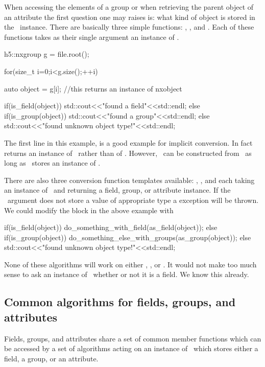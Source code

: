 
When accessing the elements of a group or when retrieving the parent object of
an attribute the first question one may raises is: what kind of object is stored
in the \nxobject\ instance. 
There are basically three simple functions: ,
, and . Each of these functions takes as their
single argument an instance of \nxobject. 
\begin{cppcode}
h5::nxgroup g = file.root();

for(size_t i=0;i<g.size();++i)
{
    auto object = g[i]; //this returns an instance of nxobject 

    if(is_field(object))
        std::cout<<"found a field"<<std::endl;
    else if(is_group(object))
        std::cout<<"found a group"<<std::endl;
    else
        std::cout<<"found unknown object type!"<<std::endl;
}
\end{cppcode}
The first line in this example,  is a 
good example for implicit conversion. In fact  returns an instance
of \nxobject\ rather than of \nxgroup. However, \nxgroup\ can be constructed 
from \nxobject\ as long as \nxobject\ stores an instance of \nxgroup.

There are also three conversion function templates available: , 
, and  each taking an instance of 
\nxobject\ and returning a field, group, or attribute instance. If the 
\nxobject\ argument does not store a value of appropriate type a
 exception will be thrown. 
We could modify the  block in the above example with 
\begin{cppcode}
if(is_field(object))
    do_something_with_field(as_field(object));
else if(is_group(object))
    do_something_else_with_groups(as_group(object));
else
    std::cout<<"found unknown object type!"<<std::endl;
\end{cppcode}
None of these algorithms will work on either \nxfield, \nxgroup, or
\nxattribute. It would not make too much sense to ask an instance of \nxfield\
whether or not it is a field. We know this already. 

\subsection{Common algorithms for fields, groups, and attributes}

Fields, groups, and attributes share a set of common member functions which can
be accessed by a set of algorithms acting on an instance of \nxobject\ which 
stores either a field, a group, or an attribute. 

